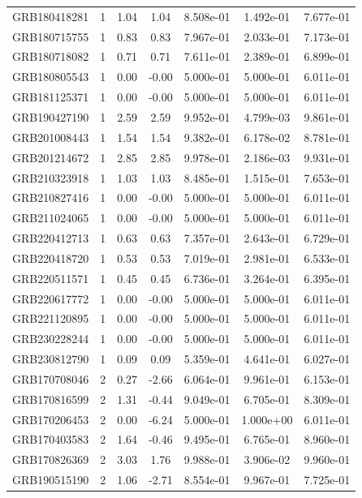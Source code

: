 \documentclass[12pt]{article}
\begin{document}
\begin{table}[h!]
{\begin{tabular}{l c c c c c c}
GRB180418281 & 1 & 1.04 & 1.04 & 8.508e-01 & 1.492e-01 & 7.677e-01 \\
GRB180715755 & 1 & 0.83 & 0.83 & 7.967e-01 & 2.033e-01 & 7.173e-01 \\
GRB180718082 & 1 & 0.71 & 0.71 & 7.611e-01 & 2.389e-01 & 6.899e-01 \\
GRB180805543 & 1 & 0.00 & -0.00 & 5.000e-01 & 5.000e-01 & 6.011e-01 \\
GRB181125371 & 1 & 0.00 & -0.00 & 5.000e-01 & 5.000e-01 & 6.011e-01 \\
GRB190427190 & 1 & 2.59 & 2.59 & 9.952e-01 & 4.799e-03 & 9.861e-01 \\
GRB201008443 & 1 & 1.54 & 1.54 & 9.382e-01 & 6.178e-02 & 8.781e-01 \\
GRB201214672 & 1 & 2.85 & 2.85 & 9.978e-01 & 2.186e-03 & 9.931e-01 \\
GRB210323918 & 1 & 1.03 & 1.03 & 8.485e-01 & 1.515e-01 & 7.653e-01 \\
GRB210827416 & 1 & 0.00 & -0.00 & 5.000e-01 & 5.000e-01 & 6.011e-01 \\
GRB211024065 & 1 & 0.00 & -0.00 & 5.000e-01 & 5.000e-01 & 6.011e-01 \\
GRB220412713 & 1 & 0.63 & 0.63 & 7.357e-01 & 2.643e-01 & 6.729e-01 \\
GRB220418720 & 1 & 0.53 & 0.53 & 7.019e-01 & 2.981e-01 & 6.533e-01 \\
GRB220511571 & 1 & 0.45 & 0.45 & 6.736e-01 & 3.264e-01 & 6.395e-01 \\
GRB220617772 & 1 & 0.00 & -0.00 & 5.000e-01 & 5.000e-01 & 6.011e-01 \\
GRB221120895 & 1 & 0.00 & -0.00 & 5.000e-01 & 5.000e-01 & 6.011e-01 \\
GRB230228244 & 1 & 0.00 & -0.00 & 5.000e-01 & 5.000e-01 & 6.011e-01 \\
GRB230812790 & 1 & 0.09 & 0.09 & 5.359e-01 & 4.641e-01 & 6.027e-01 \\
GRB170708046 & 2 & 0.27 & -2.66 & 6.064e-01 & 9.961e-01 & 6.153e-01 \\
GRB170816599 & 2 & 1.31 & -0.44 & 9.049e-01 & 6.705e-01 & 8.309e-01 \\
GRB170206453 & 2 & 0.00 & -6.24 & 5.000e-01 & 1.000e+00 & 6.011e-01 \\
GRB170403583 & 2 & 1.64 & -0.46 & 9.495e-01 & 6.765e-01 & 8.960e-01 \\
GRB170826369 & 2 & 3.03 & 1.76 & 9.988e-01 & 3.906e-02 & 9.960e-01 \\
GRB190515190 & 2 & 1.06 & -2.71 & 8.554e-01 & 9.967e-01 & 7.725e-01 \\

\end{tabular}}
\end{table}
\end{document}
